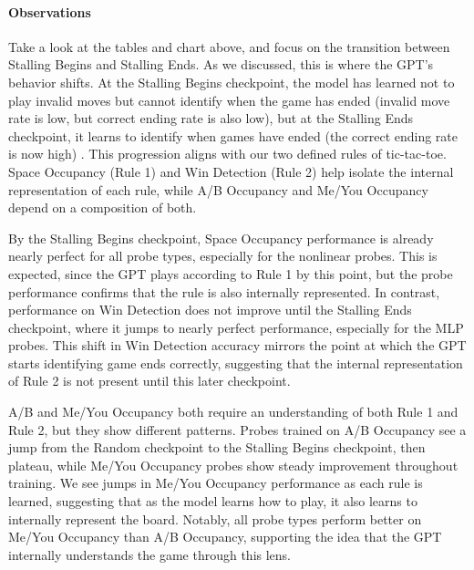 \documentclass[11pt]{article}
\begin{document}
    \paragraph{Observations}\label{observations}

Take a look at the tables and chart above, and focus on the transition
between Stalling Begins and Stalling Ends. As we discussed, this is
where the GPT's behavior shifts. At the Stalling Begins checkpoint, the
model has learned not to play invalid moves but cannot identify when the
game has ended (invalid move rate is low, but correct ending rate is
also low), but at the Stalling Ends checkpoint, it learns to identify
when games have ended (the correct ending rate is now high) . This
progression aligns with our two defined rules of tic-tac-toe. Space
Occupancy (Rule 1) and Win Detection (Rule 2) help isolate the internal
representation of each rule, while A/B Occupancy and Me/You Occupancy
depend on a composition of both.

By the Stalling Begins checkpoint, Space Occupancy performance is
already nearly perfect for all probe types, especially for the nonlinear
probes. This is expected, since the GPT plays according to Rule 1 by
this point, but the probe performance confirms that the rule is also
internally represented. In contrast, performance on Win Detection does
not improve until the Stalling Ends checkpoint, where it jumps to nearly
perfect performance, especially for the MLP probes. This shift in Win
Detection accuracy mirrors the point at which the GPT starts identifying
game ends correctly, suggesting that the internal representation of Rule
2 is not present until this later checkpoint.

A/B and Me/You Occupancy both require an understanding of both Rule 1
and Rule 2, but they show different patterns. Probes trained on A/B
Occupancy see a jump from the Random checkpoint to the Stalling Begins
checkpoint, then plateau, while Me/You Occupancy probes show steady
improvement throughout training. We see jumps in Me/You Occupancy
performance as each rule is learned, suggesting that as the model learns
how to play, it also learns to internally represent the board. Notably,
all probe types perform better on Me/You Occupancy than A/B Occupancy,
supporting the idea that the GPT internally understands the game through
this lens.
\end{document}
